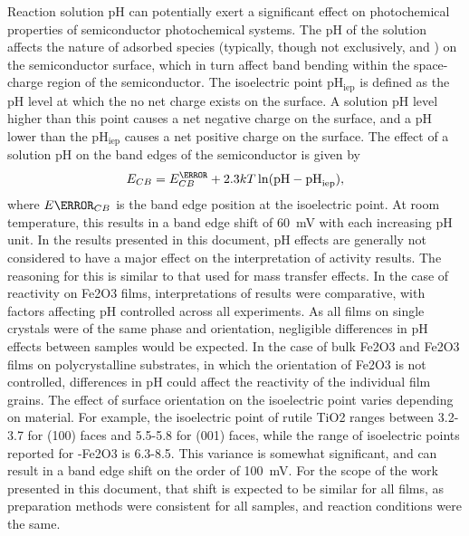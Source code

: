 \documentclass[12pt,%
              twoside,
               letterpaper]{uiothesis}
\begin{document}
\label{ph}
Reaction solution pH can potentially exert a significant effect on photochemical
properties of semiconductor photochemical systems. The pH of the solution affects the
nature of adsorbed species (typically, though not exclusively,  and )
on the semiconductor surface, which in turn affect band bending within the space-charge
region of the semiconductor. The isoelectric point pH$_{\text{iep}}$ is defined as the pH
level at which the no net charge exists on the surface. A solution pH level higher than
this point causes a net negative charge on the surface, and a pH lower than the
pH$_{\text{iep}}$ causes a net positive charge on the surface. The effect of a solution pH
on the band edges of the semiconductor is given by
\begin{equation}
E_{CB}=E^{\degree}_{CB}+2.3kT\ln(\text{pH}-\text{pH}_{\text{iep}}),
\end{equation}
where $E{\degree}_{CB}$ is the band edge position at the isoelectric point. At room
temperature, this results in a band edge shift of \SI{60}{\milli\volt} with each
increasing pH unit. In the results presented in this document, pH effects are generally
not considered to have a major effect on the interpretation of activity results. The
reasoning for this is similar to that used for mass transfer effects.  In the case of
reactivity on Fe2O3 films, interpretations of results were comparative, with factors
affecting pH controlled across all experiments. As all films on single crystals were of
the same phase and orientation, negligible differences in pH effects between samples would
be expected. In the case of bulk Fe2O3 and Fe2O3 films on polycrystalline
substrates, in which the orientation of Fe2O3 is not controlled, differences in pH
could affect the reactivity of the individual film grains. The effect of surface
orientation on the isoelectric point varies depending on material. For example, the
isoelectric point of rutile TiO2 ranges between 3.2-3.7 for (100) faces and 5.5-5.8
for (001) faces,\cite{Bullard:2006jv} while the range of isoelectric points reported for
\textalpha-Fe2O3 is
6.3-8.5.\cite{Parks:1965ys,Kosmulski:2004vn,Kosmulski:2002kx,Kosmulski:2001ww} This
variance is somewhat significant, and can result in a band edge shift on the order of
\SI{100}{\milli\volt}. For the scope of the work presented in this document, that shift is
expected to be similar for all films, as preparation methods were consistent for all
samples, and reaction conditions were the same. 
\end{document}
